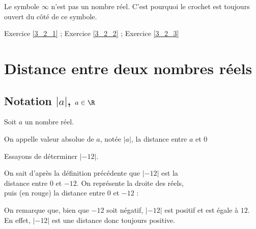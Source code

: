 \begin{rem}{}{}
Le symbole $\infty$ n'est pas un nombre réel. C'est pourquoi le crochet est toujours ouvert du côté de ce symbole.
\end{rem}

\begin{exec}
\hspace{0.4cm} \hypertarget{Ex_3_2_1}{}  Exercice \ref{3_2_1} \hspace{0.4cm};
\hspace{0.4cm} \hypertarget{Ex_3_2_2}{}  Exercice \ref{3_2_2} \hspace{0.4cm};
\hspace{0.4cm} \hypertarget{Ex_3_2_3}{}  Exercice \ref{3_2_3} \hspace{0.4cm}
\end{exec}

\section{Distance entre deux nombres réels}

\subsection{Notation $|a|$, $a \in \R$}

\begin{defi}{}{}
Soit $a$ un nombre réel.

\noindent On appelle valeur absolue de $a$, notée $|a|$, la distance entre $a$ et $0$
\end{defi}

\smallskip
\begin{ex}{}{}
Essayons de déterminer $|-12|$.\medskip 

\noindent On sait d'après la définition précédente que $|-12|$ est la \\distance entre $0$ et $-12$. On représente la droite des réels, \\puis (en rouge) la distance entre $0$ et $-12$ :

\vspace{-15mm}
\begin{flushright}
\end{flushright}

\noindent On remarque que, bien que $-12$ soit négatif, $|-12|$ est positif et est égale à $12$. En effet, $|-12|$ est une distance donc toujours positive.
\end{ex}

